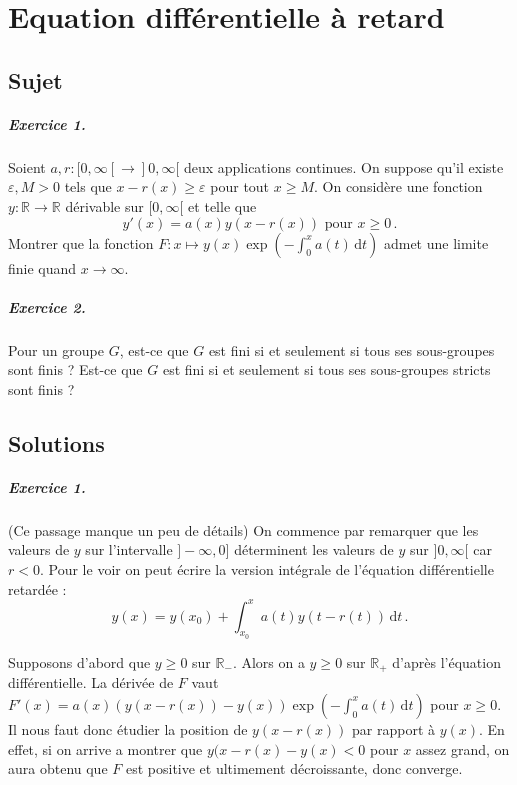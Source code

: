 \chapter{Equation différentielle à retard}

\section{Sujet}

\paragraph{Exercice 1.}

Soient $a, r : [0,\infty[ \to ]0, \infty[$ deux applications continues. On suppose qu'il existe $\varepsilon, M >0$ tels que $x-r(x) \geqslant \varepsilon$ pour tout $x \geqslant M$. On considère une fonction $y : \mathbb{R} \to \mathbb{R}$ dérivable sur $[0,\infty[$ et telle que 
\[y'(x)=a(x)y(x-r(x)) \text{ pour } x \geqslant 0\,.\]
Montrer que la fonction $F : x \mapsto y(x) \exp \left(-\int_0^xa(t)\,\mathrm{d}t\right)$ admet une limite finie quand $x \to \infty$. 

\paragraph{Exercice 2.}

Pour un groupe $G$, est-ce que $G$ est fini si et seulement si tous ses sous-groupes sont finis ? Est-ce que $G$ est fini si et seulement si tous ses sous-groupes stricts sont finis ? 

\section{Solutions}

\paragraph{Exercice 1.}

(Ce passage manque un peu de détails) On commence par remarquer que les valeurs de $y$ sur l'intervalle $]-\infty,0]$ déterminent les valeurs de $y$ sur $]0,\infty[$ car $r<0$. Pour le voir on peut écrire la version intégrale de l'équation différentielle retardée :
\[y(x)=y(x_0)+\int_{x_0}^xa(t)y(t-r(t))\,\mathrm{d}t\,.\]

Supposons d'abord que $y\geqslant 0$ sur $\mathbb{R}_-$. Alors on a $y \geqslant 0$ sur $\mathbb{R}_+$ d'après l'équation différentielle. La dérivée de $F$ vaut $F'(x)=a(x)(y(x-r(x))-y(x))\exp \left(-\int_0^x a(t)\,\mathrm{d}t\right)$ pour $x \geqslant 0$. Il nous faut donc étudier la position de $y(x-r(x))$ par rapport à $y(x)$. En effet, si on arrive a montrer que $y(x-r(x)-y(x)<0$ pour $x$ assez grand, on aura obtenu que $F$ est positive et ultimement décroissante, donc converge.


